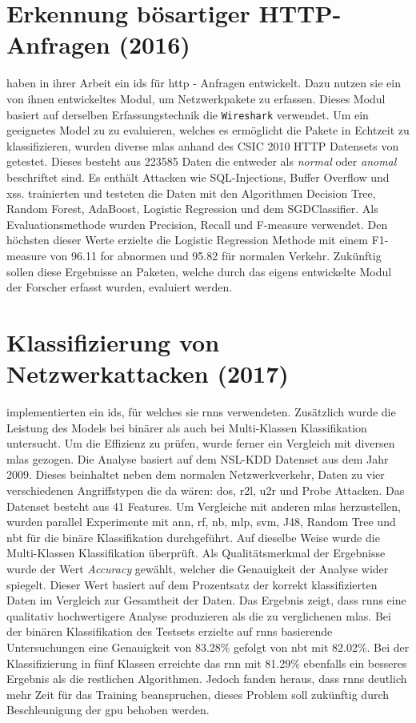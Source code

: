 \documentclass[
    12pt, %
    DIV10,
    ngerman, %
    a4paper, %
    oneside, %
    titlepage, %
    parskip=half, %
    headings=normal, %
    listof=totoc, %
    bibliography=totoc, %
    index=totoc, %
    captions=tableheading, %
    final %
]{scrreprt}
\begin{document}
\section{Erkennung bösartiger HTTP-Anfragen (2016)}
\textcite{Pham2016} haben in ihrer Arbeit ein \ac{ids} für \ac{http} - Anfragen entwickelt. Dazu nutzen sie ein von ihnen entwickeltes Modul, um Netzwerkpakete zu erfassen. Dieses Modul basiert auf derselben Erfassungstechnik die \texttt{Wireshark} verwendet. Um ein geeignetes Model zu zu evaluieren, welches es ermöglicht die Pakete in Echtzeit zu klassifizieren, wurden diverse \ac{mlas} anhand des CSIC 2010 HTTP Datensets von \textcite{csic} getestet. Dieses besteht aus 223585 Daten die entweder als \emph{normal} oder \emph{anomal} beschriftet sind. Es enthält Attacken wie SQL-Injections, Buffer Overflow und \ac{xss}. \citeauthor{Pham2016} trainierten und testeten die Daten mit den Algorithmen Decision Tree, Random Forest, AdaBoost, Logistic Regression und dem  SGDClassifier. Als Evaluationsmethode wurden Precision, Recall und F-measure verwendet. Den höchsten dieser Werte erzielte die Logistic Regression Methode mit einem F1-measure von 96.11 for abnormen und 95.82 für normalen Verkehr. Zukünftig sollen diese Ergebnisse an Paketen, welche durch das eigens entwickelte Modul der Forscher erfasst wurden, evaluiert werden.
%
\section{Klassifizierung von Netzwerkattacken (2017)}
\textcite{Yin2017} implementierten ein \ac{ids}, für welches sie \ac{rnns} verwendeten. Zusätzlich wurde die Leistung des Models bei binärer als auch bei Multi-Klassen Klassifikation untersucht. Um die Effizienz zu prüfen, wurde ferner ein Vergleich mit diversen \ac{mlas} gezogen. Die Analyse basiert auf dem NSL-KDD Datenset aus dem Jahr 2009. Dieses beinhaltet neben dem normalen Netzwerkverkehr, Daten zu vier verschiedenen Angriffstypen die da wären: \ac{dos}, \ac{r2l}, \ac{u2r} und Probe Attacken. Das Datenset besteht aus 41 Features. Um Vergleiche mit anderen \ac{mlas} herzustellen, wurden parallel Experimente mit \ac{ann}, \ac{rf}, \ac{nb}, \ac{mlp}, \ac{svm}, J48, Random Tree und \ac{nbt} für die binäre Klassifikation durchgeführt. Auf dieselbe Weise wurde die Multi-Klassen Klassifikation überprüft. Als Qualitätsmerkmal der Ergebnisse wurde der Wert \emph{Accuracy} gewählt, welcher die Genauigkeit der Analyse wider spiegelt. Dieser Wert basiert auf dem Prozentsatz der korrekt klassifizierten Daten im Vergleich zur Gesamtheit der Daten. Das Ergebnis zeigt, dass \ac{rnns} eine qualitativ hochwertigere Analyse produzieren als die zu verglichenen \ac{mlas}. Bei der binären Klassifikation des Testsets erzielte auf \ac{rnns} basierende Untersuchungen eine Genauigkeit von 83.28\% gefolgt von \ac{nbt} mit 82.02\%. Bei der Klassifizierung in fünf Klassen erreichte das \ac{rnn} mit 81.29\% ebenfalls ein besseres Ergebnis als die restlichen Algorithmen. Jedoch fanden \citeauthor{Yin2017} heraus, dass \ac{rnns} deutlich mehr Zeit für das Training beanspruchen, dieses Problem soll zukünftig durch Beschleunigung der \ac{gpu} behoben werden.
%
\end{document}
